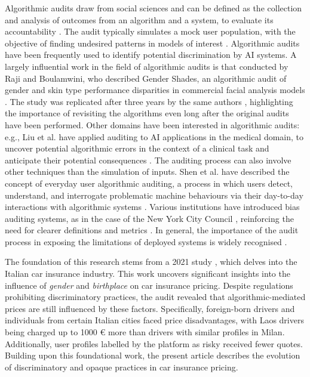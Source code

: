 Algorithmic audits draw from social sciences and can be defined as the collection and analysis of outcomes from an algorithm and a system, to evaluate its accountability \cite{goodmanellenp.ALGORITHMICAUDITINGCHASING2023}. The audit typically simulates a mock user population, with the objective of finding undesired patterns in models of interest \cite{vecchioneAlgorithmicAuditingSocial2021}.
Algorithmic audits have been frequently used to identify potential discrimination by AI systems. A largely influential work in the field of algorithmic audits is that conducted by Raji and Boulamwini, who described Gender Shades, an algorithmic audit of gender and skin type performance disparities in commercial facial analysis models \cite{rajiActionableAuditingInvestigating2019}. The study was replicated after three years by the same authors \cite{rajiActionableAuditingRevisited2022}, highlighting the importance of revisiting the algorithms even long after the original audits have been performed.
Other domains have been interested in algorithmic audits: e.g., Liu et al. have applied auditing to AI applications in the medical domain, to uncover potential algorithmic errors in the context of a clinical task and anticipate their potential consequences \cite{liuMedicalAlgorithmicAudit2022}. 
The auditing process can also involve other techniques than the simulation of inputs. Shen et al. have described the concept of everyday user algorithmic auditing, a process in which users detect, understand, and interrogate problematic machine behaviours via their day-to-day interactions with algorithmic systems \cite{shenEverydayAlgorithmAuditing2021}.
Various institutions have introduced bias auditing systems, as in the case of the New York City Council \cite{thenewyorkcitycouncilLocalLawAmend2021}, reinforcing the need for clearer definitions and metrics \cite{grovesAuditingWorkExploring2024}. In general, the importance of the audit process in exposing the limitations of deployed systems is widely recognised \cite{conitzerTechnicalPerspectiveImpact2022}.

The foundation of this research stems from a 2021 study \cite{fabrisAlgorithmicAuditItalian2021a}, which delves into the Italian car insurance industry. This work uncovers significant insights into the influence of \textit{gender} and \textit{birthplace} on car insurance pricing. Despite regulations prohibiting discriminatory practices, the audit revealed that algorithmic-mediated prices are still influenced by these factors. 
Specifically, foreign-born drivers and individuals from certain Italian cities faced price disadvantages, with Laos drivers being charged up to 1000 € more than drivers with similar profiles in Milan. Additionally, user profiles labelled by the platform as risky received fewer quotes.
Building upon this foundational work, the present article describes the evolution of discriminatory and opaque practices in car insurance pricing.

